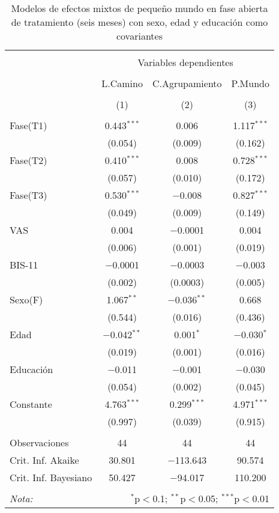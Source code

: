 \begin{table}[!htbp] \centering
    \small
  \caption{Modelos de efectos mixtos de pequeño mundo en fase abierta de tratamiento (seis meses) con sexo, edad y educación como covariantes}
  \label{tab:memL22}
\begin{tabular}{@{\extracolsep{5pt}}lccc}
\\[-1.8ex]\hline
\hline \\[-1.8ex]
 & \multicolumn{3}{c}{Variables dependientes} \\
\cline{2-4}
\\[-1.8ex] & L.Camino & C.Agrupamiento & P.Mundo \\
\\[-1.8ex] & (1) & (2) & (3)\\
\hline \\[-1.8ex]
 Fase(T1) & 0.443$^{***}$ & 0.006 & 1.117$^{***}$ \\
  & (0.054) & (0.009) & (0.162) \\
  Fase(T2) & 0.410$^{***}$ & 0.008 & 0.728$^{***}$ \\
  & (0.057) & (0.010) & (0.172) \\
  Fase(T3) & 0.530$^{***}$ & $-$0.008 & 0.827$^{***}$ \\
  & (0.049) & (0.009) & (0.149) \\
  VAS & 0.004 & $-$0.0001 & 0.004 \\
  & (0.006) & (0.001) & (0.019) \\
  BIS-11 & $-$0.0001 & $-$0.0003 & $-$0.003 \\
  & (0.002) & (0.0003) & (0.005) \\
  Sexo(F) & 1.067$^{**}$ & $-$0.036$^{**}$ & 0.668 \\
  & (0.544) & (0.016) & (0.436) \\
  Edad & $-$0.042$^{**}$ & 0.001$^{*}$ & $-$0.030$^{*}$ \\
  & (0.019) & (0.001) & (0.016) \\
  Educación & $-$0.011 & $-$0.001 & $-$0.030 \\
  & (0.054) & (0.002) & (0.045) \\
  Constante & 4.763$^{***}$ & 0.299$^{***}$ & 4.971$^{***}$ \\
  & (0.997) & (0.039) & (0.915) \\
 \hline \\[-1.8ex]
Observaciones & 44 & 44 & 44 \\
Crit. Inf. Akaike & 30.801 & $-$113.643 & 90.574 \\
Crit. Inf. Bayesiano & 50.427 & $-$94.017 & 110.200 \\
\hline
\hline \\[-1.8ex]
\textit{Nota:}  & \multicolumn{3}{r}{$^{*}$p$<$0.1; $^{**}$p$<$0.05; $^{***}$p$<$0.01} \\
\end{tabular}
\end{table}


